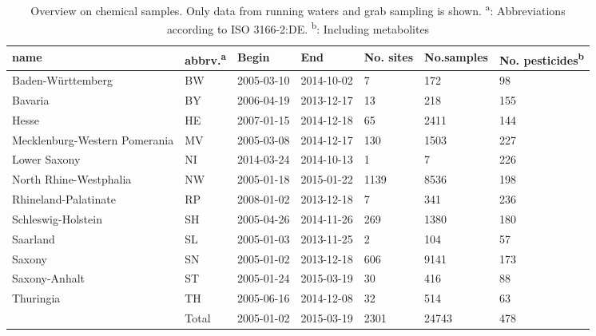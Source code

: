 \begin{table}[ht]
\centering
\caption[Overview on chemical samples.]{Overview on chemical samples. Only data from running waters and grab
sampling is shown. \textsuperscript{a}: Abbreviations according to ISO 3166-2:DE. 
      \textsuperscript{b}: Including metabolites} 
\label{tab:phch_overview}
\begin{tabular}{p{2.7cm}lllR{2cm}R{2cm}R{2cm}}
  \toprule
name & abbrv.\textsuperscript{a} & Begin & End & No. sites & No.samples & No. pesticides\textsuperscript{b} \\ 
  \midrule
Baden-Württemberg & BW & 2005-03-10 & 2014-10-02 & 7 & 172 & 98 \\ 
  Bavaria & BY & 2006-04-19 & 2013-12-17 & 13 & 218 & 155 \\ 
  Hesse & HE & 2007-01-15 & 2014-12-18 & 65 & 2411 & 144 \\ 
  Mecklenburg-Western Pomerania & MV & 2005-03-08 & 2014-12-17 & 130 & 1503 & 227 \\ 
  Lower Saxony & NI & 2014-03-24 & 2014-10-13 & 1 & 7 & 226 \\ 
  North Rhine-Westphalia & NW & 2005-01-18 & 2015-01-22 & 1139 & 8536 & 198 \\ 
  Rhineland-Palatinate & RP & 2008-01-02 & 2013-12-18 & 7 & 341 & 236 \\ 
  Schleswig-Holstein & SH & 2005-04-26 & 2014-11-26 & 269 & 1380 & 180 \\ 
  Saarland & SL & 2005-01-03 & 2013-11-25 & 2 & 104 & 57 \\ 
  Saxony & SN & 2005-01-02 & 2013-12-18 & 606 & 9141 & 173 \\ 
  Saxony-Anhalt & ST & 2005-01-24 & 2015-03-19 & 30 & 416 & 88 \\ 
  Thuringia & TH & 2005-06-16 & 2014-12-08 & 32 & 514 & 63 \\ 
   \midrule
 & Total & 2005-01-02 & 2015-03-19 & 2301 & 24743 & 478 \\ 
   \bottomrule
\end{tabular}
\end{table}
